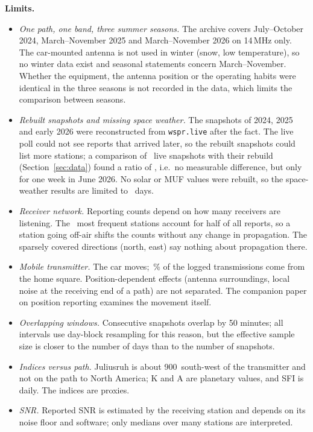 \documentclass[10pt,a4paper]{article}
\begin{document}
\textbf{Limits.}
\begin{itemize}
\item \emph{One path, one band, three summer seasons.} The archive covers July--October 2024, March--November 2025 and March--November 2026 on 14\,MHz only. The car-mounted antenna is not used in winter (snow, low temperature), so no winter data exist and seasonal statements concern March--November. Whether the equipment, the antenna position or the operating habits were identical in the three seasons is not recorded in the data, which limits the comparison between seasons.
\item \emph{Rebuilt snapshots and missing space weather.} The snapshots of 2024, 2025 and early 2026 were reconstructed from \texttt{wspr.live} after the fact. The live poll could not see reports that arrived later, so the rebuilt snapshots could list more stations; a comparison of \cmpSnaps\ live snapshots with their rebuild (Section~\ref{sec:data}) found a ratio of \cmpRatio, i.e.\ no measurable difference, but only for one week in June 2026. No solar or MUF values were rebuilt, so the space-weather results are limited to \swDays\ days.
\item \emph{Receiver network.} Reporting counts depend on how many receivers are listening. The \halfStations\ most frequent stations account for half of all reports, so a station going off-air shifts the counts without any change in propagation. The sparsely covered directions (north, east) say nothing about propagation there.
\item \emph{Mobile transmitter.} The car moves; \homeShare\,\% of the logged transmissions come from the home square. Position-dependent effects (antenna surroundings, local noise at the receiving end of a path) are not separated. The companion paper on position reporting examines the movement itself.
\item \emph{Overlapping windows.} Consecutive snapshots overlap by 50 minutes; all intervals use day-block resampling for this reason, but the effective sample size is closer to the number of days than to the number of snapshots.
\item \emph{Indices versus path.} Juliusruh is about 900\km\ south-west of the transmitter and not on the path to North America; K and A are planetary values, and SFI is daily. The indices are proxies.
\item \emph{SNR.} Reported SNR is estimated by the receiving station and depends on its noise floor and software; only medians over many stations are interpreted.
\end{itemize}
\end{document}
